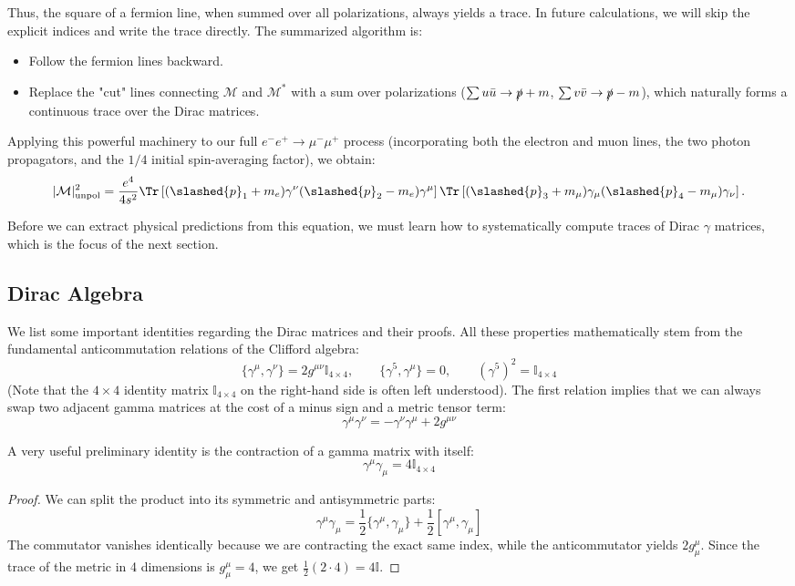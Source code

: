 Thus, the square of a fermion line, when summed over all polarizations, always yields a trace. In future calculations, we will skip the explicit indices and write the trace directly. The summarized algorithm is:
\begin{itemize}
    \item Follow the fermion lines backward.
    \item Replace the "cut" lines connecting \(\mathcal{M}\) and \(\mathcal{M}^*\) with a sum over polarizations (\(\sum u\bar{u} \to \slashed{p}+m\), \(\sum v\bar{v} \to \slashed{p}-m\)), which naturally forms a continuous trace over the Dirac matrices.
\end{itemize}

Applying this powerful machinery to our full \(e^- e^+ \to \mu^- \mu^+\) process (incorporating both the electron and muon lines, the two photon propagators, and the \(1/4\) initial spin-averaging factor), we obtain:
\[
    \vert \mathcal{M} \vert_{\text{unpol}}^2 = \frac{e^4}{4 s^2} \Tr \left[ (\slashed{p}_1 + m_e) \gamma^\nu (\slashed{p}_2 - m_e) \gamma^\mu \right] \Tr \left[ (\slashed{p}_3 + m_\mu) \gamma_\mu (\slashed{p}_4 - m_\mu) \gamma_\nu \right].
\]

Before we can extract physical predictions from this equation, we must learn how to systematically compute traces of Dirac \(\gamma\) matrices, which is the focus of the next section.

\subsection{Dirac Algebra}

We list some important identities regarding the Dirac matrices and their proofs. All these properties mathematically stem from the fundamental anticommutation relations of the Clifford algebra:
\[
    \{\gamma^\mu, \gamma^\nu\} = 2g^{\mu\nu}\mathbb{I}_{4\times4}, \qquad \{\gamma^5, \gamma^\mu\} = 0, \qquad (\gamma^5)^2 = \mathbb{I}_{4\times4}
\]
(Note that the $4 \times 4$ identity matrix $\mathbb{I}_{4\times4}$ on the right-hand side is often left understood). The first relation implies that we can always swap two adjacent gamma matrices at the cost of a minus sign and a metric tensor term:
\[
    \gamma^\mu \gamma^\nu = -\gamma^\nu \gamma^\mu + 2g^{\mu\nu}
\]

A very useful preliminary identity is the contraction of a gamma matrix with itself:
\[
    \gamma^\mu \gamma_\mu = 4 \mathbb{I}_{4\times4}
\]
\begin{proof}
    We can split the product into its symmetric and antisymmetric parts:
    \[
        \gamma^\mu \gamma_\mu = \frac{1}{2}\{\gamma^\mu, \gamma_\mu\} + \frac{1}{2}[\gamma^\mu, \gamma_\mu]
    \]
    The commutator vanishes identically because we are contracting the exact same index, while the anticommutator yields $2g^\mu_\mu$. Since the trace of the metric in 4 dimensions is $g^\mu_\mu = 4$, we get $\frac{1}{2}(2 \cdot 4) = 4\mathbb{I}$.
\end{proof}

